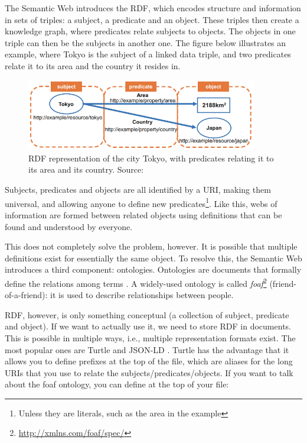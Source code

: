 \noindent The Semantic Web introduces the \gls{RDF}, which encodes structure and information in sets of triples: a subject, a predicate and an object. These triples then create a knowledge graph, where predicates relate subjects to objects. The objects in one triple can then be the subjects in another one. The figure below illustrates an example, where Tokyo is the subject of a linked data triple, and two predicates relate it to its area and the country it resides in.

\begin{figure}[H]
    \centering
    \includegraphics[width = 0.9\textwidth]{images/background/linked-data.png}
    \caption{\gls{RDF} representation of the city Tokyo, with predicates relating it to its area and its country. Source: \citet{generating-pva}}
    \label{fig:linked-data}
\end{figure}

\noindent Subjects, predicates and objects are all identified by a URI, making them universal, and allowing anyone to define new predicates\footnote{Unless they are literals, such as the area in the example}. Like this, webs of information are formed between related objects using definitions that can be found and understood by everyone.

This does not completely solve the problem, however. It is possible that multiple definitions exist for essentially the same object. To resolve this, the Semantic Web introduces a third component: ontologies. Ontologies are documents that formally define the relations among terms \citep{semantic-web}. A widely-used ontology is called \textit{foaf}\footnote{\url{ http://xmlns.com/foaf/spec/}} (friend-of-a-friend): it is used to describe relationships between people.

\gls{RDF}, however, is only something conceptual (a collection of subject, predicate and object). If we want to actually use it, we need to store \gls{RDF} in documents. This is possible in multiple ways, i.e., multiple representation formats exist. The most popular ones are Turtle \citep{turtle} and JSON-LD \citep{jsonld}. Turtle has the advantage that it allows you to define prefixes at the top of the file, which are aliases for the long URIs that you use to relate the subjects/predicates/objects. If you want to talk about the foaf ontology, you can define at the top of your file:

